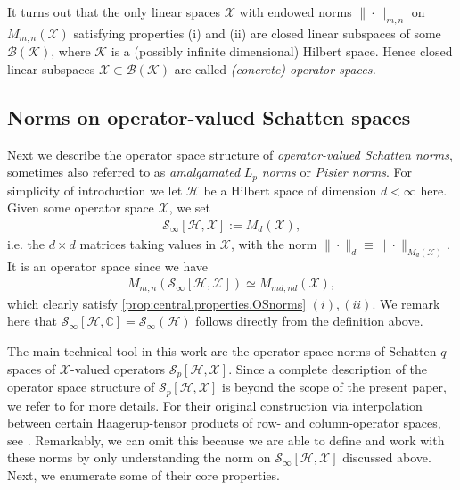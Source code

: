\documentclass[11pt]{article}
\newcommand{\1}{\ensuremath{\mathbbm{1}}}
\theoremstyle{newdefinition}
\theoremstyle{newplain}
\theoremstyle{myplain}
\begin{document}
It turns out that the only linear spaces $\mathcal{X}$ with endowed norms $\|\cdot \|_{m,n}$ on $M_{m,n}(\mathcal{X})$ satisfying properties (i) and (ii) are closed linear subspaces of some $\mathcal{B}(\mathcal{K})$, where $\mathcal{K}$ is a (possibly infinite dimensional) Hilbert space. 
Hence closed linear subspaces $\mathcal{X}\subset\mathcal{B}(\mathcal{K})$ are called \textit{(concrete) operator spaces.}

\subsection{Norms on operator-valued Schatten spaces}\label{pre:Operator.valued.Schatten}


Next we describe the operator space structure of \textit{operator-valued Schatten norms}, sometimes also referred to as \textit{amalgamated} $L_p$ \textit{norms} or \textit{Pisier norms}. For simplicity of introduction we let $\mathcal{H}$ be a Hilbert space of dimension $d<\infty$ here. Given some operator space $\mathcal{X}$, we set
\begin{align}
\mathcal{S}_\infty[\mathcal{H},\mathcal{X}]:=M_d(\mathcal{X}),
\end{align} i.e. the $d\times d$ matrices taking values in $\mathcal{X}$, with the norm $\|\cdot\|_d\equiv\|\cdot\|_{M_{d}(\mathcal{X})}$. It is an operator space since we have 
\begin{align}
M_{m,n}(\mathcal{S}_\infty[\mathcal{H},\mathcal{X}]) \simeq M_{md,nd}(\mathcal{X}),
\end{align} which clearly satisfy \cref{prop:central.properties.OSnorms} $(i),(ii)$.
We remark here that $\mathcal{S}_\infty[\mathcal{H},\mathbb{C}]=\mathcal{S}_\infty(\mathcal{H})$ follows directly from the definition above.

The main technical tool in this work are the operator space norms of Schatten-$q$-spaces of $\mathcal{X}$-valued operators $\mathcal{S}_p[\mathcal{H},\mathcal{X}]$. Since a complete description of the operator space structure of $\mathcal{S}_p[\mathcal{H},\mathcal{X}]$ is beyond the scope of the present paper, we refer to \cite{Beigi.2023,Devetak.2006} for more details. For their original construction via interpolation between certain Haagerup-tensor products of row- and column-operator spaces, see \cite{Book.Pisier.1998}.
Remarkably, we can omit this because we are able to define and work with these norms by only understanding the norm on $\mathcal{S}_\infty[\mathcal{H},\mathcal{X}]$ discussed above. Next, we enumerate some of their core properties.
 
\end{document}
